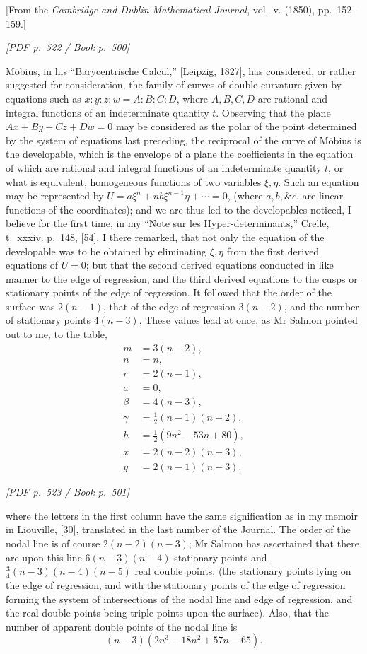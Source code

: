 \documentclass[11pt]{article}
\newcommand{\Page}[2]{\bigskip\noindent\textit{[PDF p.~#1 / Book p.~#2]}\par\smallskip}
\begin{document}
\begin{center}
[From the \textit{Cambridge and Dublin Mathematical Journal}, vol.~v. (1850),
pp.~152--159.]
\end{center}

\Page{522}{500}

M\"obius, in his ``Barycentrische Calcul,'' [Leipzig, 1827], has considered, or rather
suggested for consideration, the family of curves of double curvature given by equations
such as $x:y:z:w=A:B:C:D$, where $A,B,C,D$ are rational and integral functions of
an indeterminate quantity $t$. Observing that the plane $Ax+By+Cz+Dw=0$ may be
considered as the polar of the point determined by the system of equations last
preceding, the reciprocal of the curve of M\"obius is the developable, which is the
envelope of a plane the coefficients in the equation of which are rational and integral
functions of an indeterminate quantity $t$, or what is equivalent, homogeneous functions
of two variables $\xi,\eta$. Such an equation may be represented by
$U=a\xi^n+nb\xi^{n-1}\eta+\cdots=0$, (where $a,b,\&c.$ are linear functions of the
coordinates); and we are thus led to the developables noticed, I believe for the first
time, in my ``Note sur les Hyper-determinants,'' Crelle, t.~xxxiv. p.~148, [54].
I there remarked, that not only the equation of the developable was to be obtained by
eliminating $\xi,\eta$ from the first derived equations of $U=0$; but that the second
derived equations conducted in like manner to the edge of regression, and the third
derived equations to the cusps or stationary points of the edge of regression. It
followed that the order of the surface was $2(n-1)$, that of the edge of regression
$3(n-2)$, and the number of stationary points $4(n-3)$. These values lead at once,
as Mr Salmon pointed out to me, to the table,
\[
\begin{array}{rl}
m&=3(n-2),\\
n&=n,\\
r&=2(n-1),\\
a&=0,\\
\beta&=4(n-3),\\
\gamma&=\frac12(n-1)(n-2),\\
h&=\frac12(9n^2-53n+80),\\
x&=2(n-2)(n-3),\\
y&=2(n-1)(n-3).
\end{array}
\]

\Page{523}{501}

\noindent where the letters in the first column have the same signification as in my memoir
in Liouville, [30], translated in the last number of the Journal. The order of the
nodal line is of course $2(n-2)(n-3)$; Mr Salmon has ascertained that there are upon
this line $6(n-3)(n-4)$ stationary points and
$\frac34(n-3)(n-4)(n-5)$ real double points, (the stationary points lying on the edge
of regression, and with the stationary points of the edge of regression forming the
system of intersections of the nodal line and edge of regression, and the real double
points being triple points upon the surface). Also, that the number of apparent double
points of the nodal line is
\[
        (n-3)(2n^3-18n^2+57n-65).
\]
\end{document}
